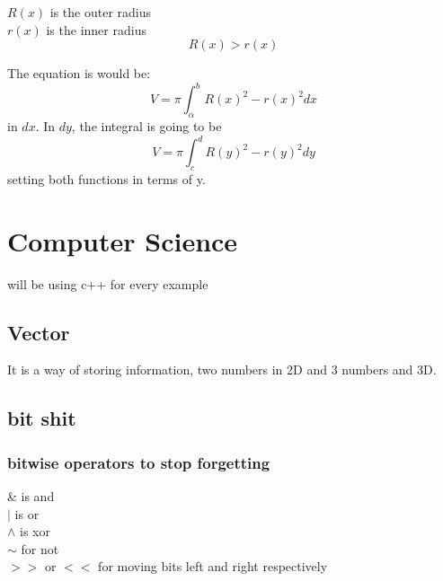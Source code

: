\documentclass{article} %
\theoremstyle{theorem}
\theoremstyle{definition}
\newtheorem{definition}{Definition}
\begin{document}
                    \begin{center}
                        $R(x)$ is the outer radius\\ 
                        $r(x)$ is the inner radius $$R(x)>r(x)$$
                    \end{center}
                    The equation is would be:
                    \begin{equation}
                        V=\pi\int_{\alpha}^{b}R(x)^2 - r(x)^2dx
                        \label{eq:volDonutDx}
                    \end{equation}
                    in $dx$. In $dy$, the integral is going to be 
                    \begin{equation}
                        V=\pi\int_{c}^{d}R(y)^2-r(y)^2dy
                        \label{eq:volDonutDy}
                    \end{equation}
                    setting both functions in terms of y.
\pagebreak
\section{Computer Science}\label{sec:csSec}
will be using c++ for every example
    \subsection{Vector}\label{sub:csVec}
    It is a way of storing information, two numbers in 2D and 3 numbers and 3D.
    \subsection{bit shit}
        \subsubsection{bitwise operators to stop forgetting}
            \begin{center}
                \& is and\\$|$ is or\\$\wedge$ is xor\\$\sim$ for not\\$>>$ or $<<$ for moving bits left and right respectively
            \end{center}
\end{document}
